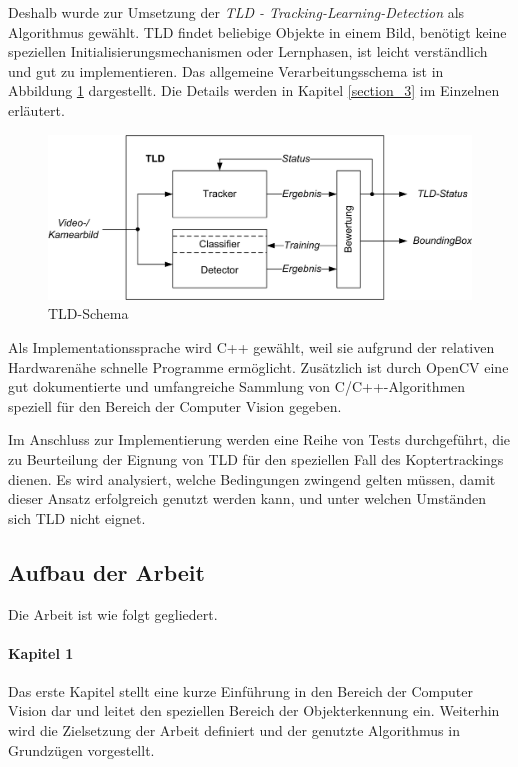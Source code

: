 Deshalb wurde zur Umsetzung der \textit{TLD - Tracking-Learning-Detection} \cite{TLD} als Algorithmus gewählt. TLD findet beliebige Objekte in einem Bild, benötigt keine speziellen Initialisierungsmechanismen oder Lernphasen, ist leicht verständlich und gut zu implementieren. Das allgemeine Verarbeitungsschema ist in Abbildung \ref{TLD-Schema} dargestellt. Die Details werden in Kapitel \ref{section_3} im Einzelnen erläutert.

\begin{figure}
\centering{}\includegraphics[scale=0.75]{../pictures/TLD-Framework.jpg}\caption{TLD-Schema}
\label{TLD-Schema}
\end{figure}

Als Implementationssprache wird C++ gewählt, weil sie aufgrund der relativen Hardwarenähe schnelle Programme ermöglicht. Zusätzlich ist durch OpenCV \cite{OCV} eine gut dokumentierte und umfangreiche Sammlung von C/C++-Algorithmen speziell für den Bereich der Computer Vision gegeben.

Im Anschluss zur Implementierung werden eine Reihe von Tests durchgeführt, die zu Beurteilung der Eignung von TLD für den speziellen Fall des Koptertrackings dienen. Es wird analysiert, welche Bedingungen zwingend gelten müssen, damit dieser Ansatz erfolgreich genutzt werden kann, und unter welchen Umständen sich TLD nicht eignet.

\subsection{Aufbau der Arbeit}
Die Arbeit ist wie folgt gegliedert.

\paragraph{Kapitel 1}
  Das erste Kapitel stellt eine kurze Einführung in den Bereich der Computer Vision dar und leitet den speziellen Bereich der Objekterkennung ein. Weiterhin wird die Zielsetzung der Arbeit definiert und der genutzte Algorithmus in Grundzügen vorgestellt.

